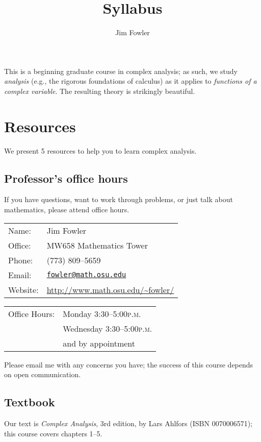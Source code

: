 \documentclass[12pt]{handout}
\title{Syllabus}
\author{Jim Fowler}
\newcommand{\peem}{\textsc{p.m.}}
\begin{document}
\maketitle

\noindent This is a beginning graduate course in complex analysis; as such, we study \textit{analysis} (e.g., the rigorous foundations of calculus) as it applies to \textit{functions of a complex variable}.  The resulting theory is strikingly beautiful.



\section*{Resources}

\noindent%
We present 5 resources to help you to learn complex analysis.

\subsection*{Professor's office hours}
If you have questions, want to work through problems, or just talk
about mathematics, please attend office hours.

\vspace{1ex}%
\noindent\parbox{0.5\textwidth}{%
\noindent\begin{tabular}{@{}ll}
\textsf{Name:} & Jim Fowler \\
\textsf{Office:} & MW658 Mathematics Tower \\
\textsf{Phone:} & (773) 809--5659 \\
\textsf{Email:} & \href{mailto:fowler@math.osu.edu}{\texttt{fowler@math.osu.edu}} \\
\textsf{Website:} & \url{http://www.math.osu.edu/~fowler/}
\end{tabular}}
\noindent\parbox{0.5\textwidth}{%
\begin{tabular}{@{}ll}
\textsf{Office Hours:}
& Monday 3:30--5:00\peem \\
& Wednesday 3:30--5:00\peem \\
& and by appointment
\end{tabular}}

\vspace{1ex}\noindent
Please email me with any concerns you have; the success of this course
depends on open communication.

\subsection*{Textbook}
Our text is \textit{Complex Analysis}, 3rd edition, by
Lars Ahlfors (ISBN 0070006571); this course covers chapters 1--5.
\end{document}

